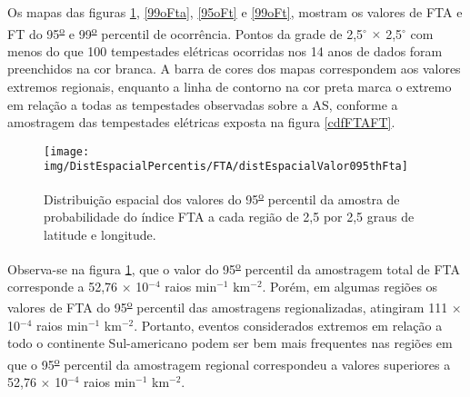 

Os mapas das figuras \ref{95oFta}, \ref{99oFta}, \ref{95oFt}  e \ref{99oFt}, mostram os valores de FTA e FT do 95\textsuperscript{\underline{o}} e 99\textsuperscript{\underline{o}} percentil de ocorrência. Pontos da grade de 2,5$^{\circ}$ $\times$ 2,5$^{\circ}$ com menos do que 100 tempestades elétricas ocorridas nos 14 anos de dados foram preenchidos na cor branca. A barra de cores dos mapas correspondem aos valores extremos regionais, enquanto a linha de contorno na cor preta marca o extremo em relação a todas as tempestades observadas sobre a AS, conforme a amostragem das tempestades elétricas exposta na figura \ref{cdfFTAFT}.

\begin{figure}[!ht]
\centering
{\texttt{[image: img/DistEspacialPercentis/FTA/distEspacialValor095thFta]}} 
\caption{Distribuição espacial dos valores do 95\textsuperscript{\underline{o}} percentil da amostra de probabilidade do índice FTA a cada região de 2,5 por 2,5 graus de latitude e longitude.}
\label{95oFta}
\end{figure}

Observa-se na figura \ref{95oFta}, que o valor do 95\textsuperscript{\underline{o}} percentil da amostragem total de FTA corresponde a 52,76 $\times$ 10$^{-4}$ raios min$^{-1}$
km$^{-2}$. Porém, em algumas regiões os valores de FTA do 95\textsuperscript{\underline{o}} percentil das amostragens regionalizadas, atingiram  111 $\times$ 10$^{-4}$ raios min$^{-1}$ km$^{-2}$. Portanto, eventos considerados extremos em relação a todo o continente Sul-americano podem ser bem mais frequentes nas regiões em que o 95\textsuperscript{\underline{o}} percentil da amostragem regional correspondeu a valores superiores a 52,76 $\times$ 10$^{-4}$ raios min$^{-1}$ km$^{-2}$.
  
